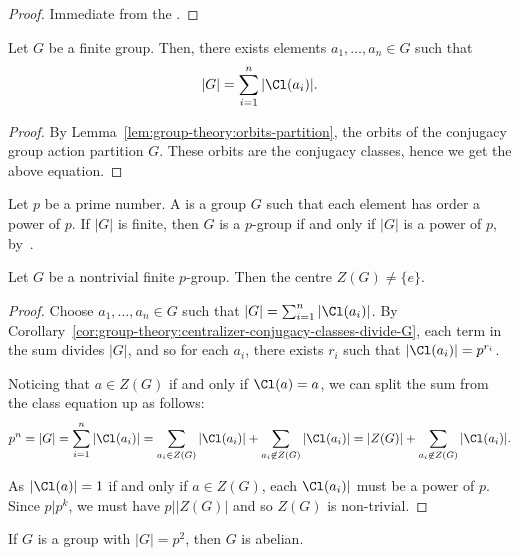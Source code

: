 \documentclass[12pt]{report}
\begin{document}
\begin{proof}
  Immediate from the .
\end{proof}

\begin{corollary}\label{cor:group-theory:class-equation}
  Let \(G\) be a finite group. Then, there exists elements \(a_{1}, \ldots, a_{n} \in G\) such that
  \[|G| = \sum_{i=1}^{n} |\Cl(a_{i})|.\]
\end{corollary}

\begin{proof}
  By Lemma~\ref{lem:group-theory:orbits-partition}, the orbits of the conjugacy group action partition \(G\). These orbits are the conjugacy classes, hence we get the above equation.
\end{proof}


\begin{definition}
  Let \(p\) be a prime number. A  is a group \(G\) such that each element has order a power of \(p\). If \(|G|\) is finite, then \(G\) is a \(p\)-group if and only if \(|G|\) is a power of \(p\), by~.
\end{definition}


\begin{theorem}\label{thm:group-theory:p-group-non-trivial-centre}
  Let \(G\) be a nontrivial finite \(p\)-group. Then the centre \(Z(G) \neq \{e\}\).
\end{theorem}

\begin{proof}
  Choose \(a_{1}, \ldots, a_{n} \in G\) such that \(|G| = \sum_{i=1}^{n} |\Cl(a_{i})|\). By Corollary~\ref{cor:group-theory:centralizer-conjugacy-classes-divide-G}, each term in the sum divides \(|G|\), and so for each \(a_{i}\), there exists \(r_{i}\) such that \(|\Cl(a_{i})| = p^{r_{i}}\).

  Noticing that \(a \in Z(G)\) if and only if \(\Cl(a) = {a}\), we can split the sum from the class equation up as follows:
  \[ p^{n} = |G| = \sum_{i=1}^{n} |\Cl(a_{i})| = \sum_{a_{i} \in Z(G)} |\Cl(a_{i})|+ \sum_{a_i \not\in Z(G)} |\Cl(a_{i})|= |Z(G)| + \sum_{a_i \not\in Z(G)}|\Cl(a_{i})|.\]

  As \(|\Cl(a)| = 1\) if and only if \(a \in Z(G)\), each \(\Cl(a_{i})|\) must be a power of \(p\). Since \(p | p^{k}\), we must have \(p | |Z(G)|\) and so \(Z(G)\) is non-trivial.
\end{proof}

\begin{corollary}
  If \(G\) is a group with \(|G| = p^{2}\), then \(G\) is abelian.
\end{corollary}
\end{document}
